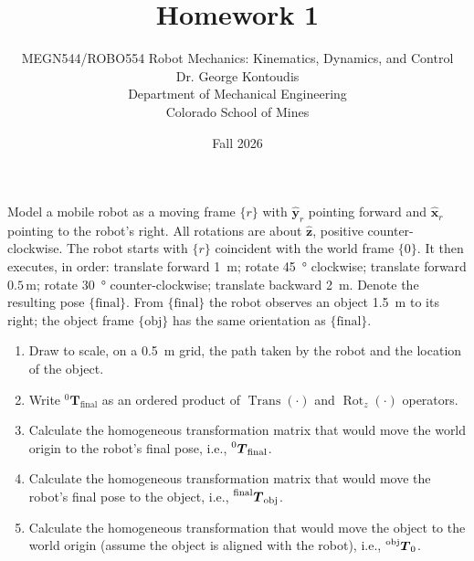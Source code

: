 \documentclass[12pt]{article}
\newenvironment{problem}[2][Problem]{\begin{trivlist}
\item[\hskip \labelsep {\bfseries #1}\hskip \labelsep {\bfseries #2.}]}{\end{trivlist}}
\newcommand{\T}{\bm{T}}
\newcommand{\framen}[1]{\{#1\}}
\newcommand{\Trans}{\operatorname{Trans}}
\newcommand{\Rotz}{\operatorname{Rot}_z}
\begin{document}
 
 
\title{Homework 1}
\author{MEGN544/ROBO554 Robot Mechanics: Kinematics, Dynamics, and Control  
\\ 
Dr. George Kontoudis\\
Department of Mechanical Engineering\\
Colorado School of Mines}
\date{Fall 2026}
 
\maketitle
\begin{problem}{1}%
Model a mobile robot as a moving frame $\framen{r}$ with $\hat{\bm{y}}_r$ pointing forward and $\hat{\bm{x}}_r$ pointing to the robot's right. All rotations are about $\hat{\bm{z}}$, positive counter-clockwise. The robot starts with $\framen{r}$ coincident with the world frame $\framen{0}$. It then executes, in order: translate forward \SI{1}{\meter}; rotate \SI{45}{\degree} clockwise; translate forward $0.5\,$\unit{m}; rotate \SI{30}{\degree} counter-clockwise; translate backward \SI{2}{\meter}. Denote the resulting pose $\{\textrm{final}\}$. From $\{\textrm{final}\}$ the robot observes an object \SI{1.5}{\meter} to its right; the object frame $\{\textrm{obj}\}$ has the same orientation as $\{\textrm{final}\}$.

\begin{enumerate}[label=(\alph*)]
    \item Draw to scale, on a \SI{0.5}{\meter} grid, the path taken by the robot and the
        location of the object.
    \item Write $^{0}\T_{\textrm{final}}$ as an ordered product of $\Trans(\cdot)$ and $\Rotz(\cdot)$  operators.
    \item Calculate the homogeneous transformation matrix that would move the world origin to the robot’s final pose, i.e., $\prescript{0}{}{\boldsymbol{T}}_{\textrm{final}}$.
    \item Calculate the homogeneous transformation matrix that would move the robot’s final pose to the object, i.e., $\prescript{\textrm{final}}{}{\boldsymbol{T}}_{\textrm{obj}}$.
    \item Calculate the homogeneous transformation that would move the object to the world origin (assume the object is aligned with the robot), i.e., $\prescript{\textrm{obj}}{}{\boldsymbol{T}}_{0}$.
\end{enumerate}



 
\end{problem}
\end{document}
